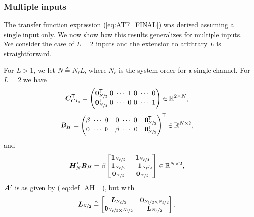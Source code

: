 \subsubsection*{Multiple inputs}
The transfer function expression (\ref{eq:ATF_FINAL}) was derived assuming a single input only. We now show how this results generalizes for multiple inputs. We consider the case of $L=2$ inputs and the extension to arbitrary $L$ is straightforward.

For $L>1$, we let $N \triangleq N_\ell L$, where $N_\ell$ is the system order for a single channel. For $L=2$ we have
\begin{equation}
    \bm{C}^\mathsf{T}_{CI_s} =
    \begin{pmatrix}
        \bm{0}_{\nicefrac{N}{2}}^\mathsf{T} \ 0 \ \cdots \ 1 \ 0 \ \cdots \ 0 \\
        \bm{0}_{\nicefrac{N}{2}}^\mathsf{T} \ 0 \ \cdots \ 0 \ 0 \ \cdots \ 1
    \end{pmatrix} \in \mathbb{R}^{2 \times N},
\end{equation}
\begin{equation}
    \bm{B}_H =
    \begin{pmatrix}
        \beta \ \cdots \ 0 & 0 \ \cdots \ 0 & \bm{0}_{\nicefrac{N}{2}}^\mathsf{T} \\
        0 \ \cdots \ 0 & \beta \ \cdots \ 0 & \bm{0}_{\nicefrac{N}{2}}^\mathsf{T}
    \end{pmatrix}^\mathsf{T}  \in \mathbb{R}^{N \times 2},
\end{equation}
and
\begin{equation}
    \bm{H_}{N}'\bm{B}_H = \beta
    \begin{bmatrix}
        \bm{1}_{\nicefrac{N_\ell}{2}} & \bm{1}_{\nicefrac{N_\ell}{2}} \\
        \bm{1}_{\nicefrac{N_\ell}{2}} & -\bm{1}_{\nicefrac{N_\ell}{2}} \\
        \bm{0}_{\nicefrac{N}{2}} & \bm{0}_{\nicefrac{N}{2}}
    \end{bmatrix}  \in \mathbb{R}^{N \times 2},
\end{equation}
$\bm{A}'$ is as given by (\ref{eq:def_AH_}), but with
\begin{equation}
    \bm{L}_{\nicefrac{N}{2}} \triangleq
    \begin{bmatrix}
        \bm{L}_{\nicefrac{N_\ell}{2}} & \bm{0}_{\nicefrac{N_\ell}{2} \times \nicefrac{N_\ell}{2}} \\
        \bm{0}_{\nicefrac{N_\ell}{2} \times \nicefrac{N_\ell}{2}} & \bm{L}_{\nicefrac{N_\ell}{2}}
    \end{bmatrix}.
\end{equation}

